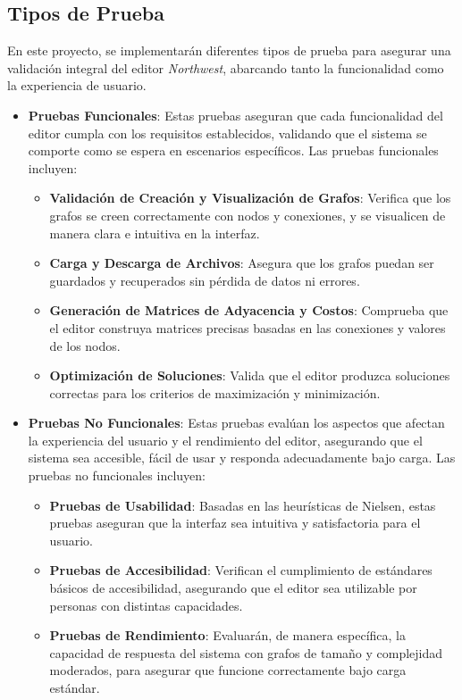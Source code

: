\documentclass[stu, 12pt, letterpaper, donotrepeattitle, floatsintext, natbib]{apa7}
\begin{document}
\subsection{Tipos de Prueba}

\noindent En este proyecto, se implementarán diferentes tipos de prueba para asegurar una validación integral del editor \textit{Northwest}, abarcando tanto la funcionalidad como la experiencia de usuario.

\begin{itemize}
    \item \textbf{Pruebas Funcionales}: Estas pruebas aseguran que cada funcionalidad del editor cumpla con los requisitos establecidos, validando que el sistema se comporte como se espera en escenarios específicos. Las pruebas funcionales incluyen:
    \begin{itemize}
        \item \textbf{Validación de Creación y Visualización de Grafos}: Verifica que los grafos se creen correctamente con nodos y conexiones, y se visualicen de manera clara e intuitiva en la interfaz.
        \item \textbf{Carga y Descarga de Archivos}: Asegura que los grafos puedan ser guardados y recuperados sin pérdida de datos ni errores.
        \item \textbf{Generación de Matrices de Adyacencia y Costos}: Comprueba que el editor construya matrices precisas basadas en las conexiones y valores de los nodos.
        \item \textbf{Optimización de Soluciones}: Valida que el editor produzca soluciones correctas para los criterios de maximización y minimización.
    \end{itemize}

    \item \textbf{Pruebas No Funcionales}: Estas pruebas evalúan los aspectos que afectan la experiencia del usuario y el rendimiento del editor, asegurando que el sistema sea accesible, fácil de usar y responda adecuadamente bajo carga. Las pruebas no funcionales incluyen:
    \begin{itemize}
        \item \textbf{Pruebas de Usabilidad}: Basadas en las heurísticas de Nielsen, estas pruebas aseguran que la interfaz sea intuitiva y satisfactoria para el usuario.
        \item \textbf{Pruebas de Accesibilidad}: Verifican el cumplimiento de estándares básicos de accesibilidad, asegurando que el editor sea utilizable por personas con distintas capacidades.
        \item \textbf{Pruebas de Rendimiento}: Evaluarán, de manera específica, la capacidad de respuesta del sistema con grafos de tamaño y complejidad moderados, para asegurar que funcione correctamente bajo carga estándar.
    \end{itemize}


\end{itemize}
\end{document}
